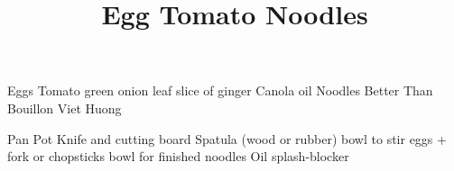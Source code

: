\documentclass[10pt, twocolumn]{recipe}
\title{Egg Tomato Noodles\vspace{-3em}}
\begin{document}
\maketitle
\begin{ingredients}
   Eggs
   Tomato
   green onion leaf
   slice of ginger
  \Item Canola oil
  \Item Noodles
  \Item \Sauce Better Than Bouillon
  \Item \Sauce Viet Huong
\end{ingredients}

\begin{equipment}
  \Item Pan
  \Item Pot
  \Item Knife and cutting board
  \Item Spatula (wood or rubber)
   bowl to stir eggs + fork or chopsticks
   bowl for finished noodles
  \Item \Optional Oil splash-blocker
\end{equipment}
\end{document}
